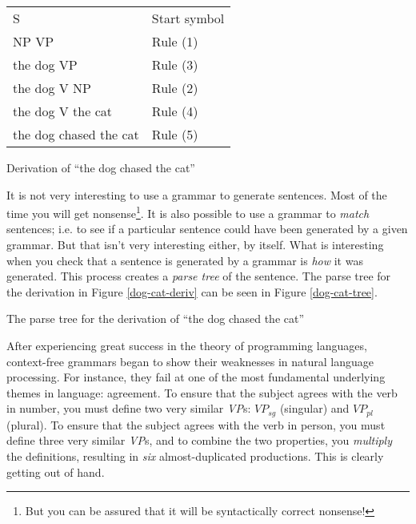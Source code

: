 \documentclass[12pt]{article}
\newcommand{\defn}[1]{\textit{#1}}
\begin{document}
\begin{Figure}
\begin{tabularx}{\linewidth}{X|X}
S                      & Start symbol \\
NP VP                  & Rule (1) \\
the dog VP             & Rule (3) \\
the dog V NP           & Rule (2) \\
the dog V the cat      & Rule (4) \\
the dog chased the cat & Rule (5) \\
\end{tabularx}
\caption{Derivation of ``the dog chased the cat''}
\label{dog-cat-deriv}
\end{Figure}

It is not very interesting to use a grammar to generate sentences.  Most
of the time you will get nonsense\footnote{But you can be assured that
it will be syntactically correct nonsense!}.  It is also possible to use
a grammar to \textit{match} sentences; i.e. to see if a particular
sentence could have been generated by a given grammar.   But that isn't
very interesting either, by itself.  What is interesting when you
check that a sentence is generated by a grammar is \textit{how} it was
generated.  This process creates a \defn{parse tree} of the sentence.
The parse tree for the derivation in Figure \ref{dog-cat-deriv} can be
seen in Figure \ref{dog-cat-tree}.

\begin{Figure}
\begin{center}
\end{center}
\caption{The parse tree for the derivation of ``the dog chased the
cat''}
\label{dog-cat-tree}
\end{Figure}

After experiencing great success in the theory of programming languages,
context-free grammars began to show their weaknesses in natural language
processing.  For instance, they fail at one of the most fundamental
underlying themes in language: agreement.  To ensure that the subject
agrees with the verb in number, you must define two very similar
\textit{VP}s: $\mathit{VP}_\mathit{sg}$ (singular) and
$\mathit{VP}_\mathit{pl}$ (plural).  To ensure that the subject agrees
with the verb in person, you must define three very similar
\textit{VP}s, and to combine the two properties, you \textit{multiply}
the definitions, resulting in \textit{six} almost-duplicated
productions.  This is clearly getting out of hand.
\end{document}
